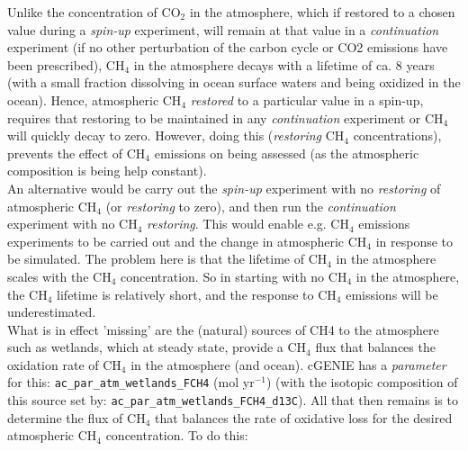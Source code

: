 Unlike the concentration of CO\(_{2}\) in the atmosphere, which if restored to a chosen value during a \textit{spin-up} experiment, will remain at that value in a \textit{continuation} experiment (if no other perturbation of the carbon cycle or CO2 emissions have been prescribed), CH\(_{4}\) in the atmosphere decays with a lifetime of ca. 8 years (with a small fraction dissolving in ocean surface waters and being oxidized in the ocean). Hence, atmospheric CH\(_{4}\) \textit{restored} to a particular value in a spin-up, requires that restoring to be maintained in any \textit{continuation} experiment or CH\(_{4}\) will quickly decay to zero. However, doing this (\textit{restoring} CH\(_{4}\) concentrations), prevents the effect of CH\(_{4}\) emissions on being assessed (as the atmospheric composition is being help constant).\\
An alternative would be carry out the \textit{spin-up} experiment with no \textit{restoring} of atmospheric CH\(_{4}\) (or \textit{restoring} to zero), and then run the \textit{continuation} experiment with no CH\(_{4}\) \textit{restoring}. This would enable e.g. CH\(_{4}\) emissions experiments to be carried out and the change in atmospheric CH\(_{4}\) in response to be simulated. The problem here is that the lifetime of  CH\(_{4}\) in the atmosphere scales with the CH\(_{4}\) concentration. So in starting with no CH\(_{4}\) in the atmosphere, the CH\(_{4}\) lifetime is relatively short, and the response to CH\(_{4}\) emissions will be underestimated.\\
What is in effect 'missing' are the (natural) sources of CH4 to the atmosphere such as wetlands, which at steady state, provide a CH\(_{4}\) flux that balances the oxidation rate of CH\(_{4}\) in the atmosphere (and ocean). cGENIE has a \textit{parameter} for this: \texttt{ac\_par\_atm\_wetlands\_FCH4} (mol yr\(^{-1}\)) (with the isotopic composition of this source set by: \texttt{ac\_par\_atm\_wetlands\_FCH4\_d13C}). All that then remains is to determine the flux of CH\(_{4}\) that balances the rate of oxidative loss for the desired atmospheric CH\(_{4}\) concentration. To do this:

